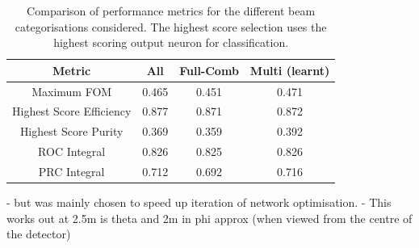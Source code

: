 \begin{table}
    \begin{tabular}{cccc}
        Metric                   & All   & Full-Comb & Multi (learnt) \\
        \midrule
        Maximum FOM              & 0.465 & 0.451     & 0.471          \\
        Highest Score Efficiency & 0.877 & 0.871     & 0.872          \\
        Highest Score Purity     & 0.369 & 0.359     & 0.392          \\
        ROC Integral             & 0.826 & 0.825     & 0.826          \\
        PRC Integral             & 0.712 & 0.692     & 0.716          \\
    \end{tabular}
    \caption[Comparison of performance metrics for the different beam categorisations considered.]
    {Comparison of performance metrics for the different beam categorisations considered. The highest
        score selection uses the highest scoring output neuron for classification.}
    \label{tab:cat}
\end{table}

- but was mainly chosen to speed up iteration of network optimisation.
- This works out at 2.5m is theta and 2m in phi approx (when viewed from the centre of the detector)